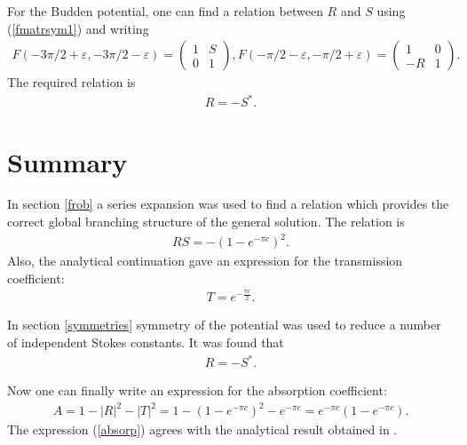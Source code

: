 \documentclass[aip,jmp,reprint]{revtex4-1}
\begin{document}
For the Budden potential, one can find a relation between $R$ and $S$ using (\ref{fmatrsym1}) and writing
\begin{eqnarray}
F(-3\pi/2+\varepsilon,-3\pi/2-\varepsilon)=\left( \begin{array}{cc} 1 & S \\ 0 & 1 \end{array} \right), 
F(-\pi/2-\varepsilon,-\pi/2+\varepsilon)=\left( \begin{array}{cc} 1 & 0 \\ -R & 1 \end{array} \right).
\end{eqnarray}
The required relation is
\begin{eqnarray}
R=-S^*.    \label{desiredrel}
\end{eqnarray}

\section{Summary \label{summury}}

In section \ref{frob} a series expansion was used to find a relation which provides the correct global branching structure of the general solution. The relation is
\begin{eqnarray}
RS=-(1-e^{-\pi c})^2.  
\end{eqnarray}
Also, the analytical continuation gave an expression for the transmission coefficient:
\begin{eqnarray}
T=e^{-\frac{\pi c}{2}}.
\end{eqnarray}

In section \ref{symmetries} symmetry of the potential was used to reduce a number of independent Stokes constants. It was found that
\begin{eqnarray}
R=-S^*. 
\end{eqnarray}

Now one can finally write an expression for the absorption coefficient:
\begin{eqnarray}
A=1-|R|^2-|T|^2=1-(1-e^{-\pi c})^2-e^{-\pi c}=e^{-\pi c}(1-e^{-\pi c}).    \label{absorp}
\end{eqnarray}
The expression (\ref{absorp}) agrees with the analytical result obtained in \cite[p 234]{rwbook}.
\end{document}
